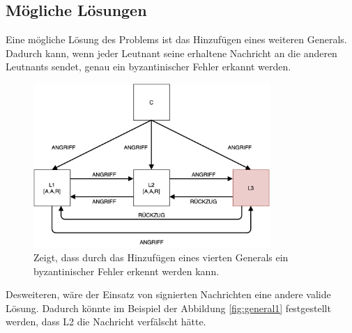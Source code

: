 \documentclass{article}
\begin{document}
\subsection{Mögliche Lösungen}
Eine mögliche Lösung des Problems ist das Hinzufügen eines weiteren Generals. 
Dadurch kann, wenn jeder Leutnant seine erhaltene Nachricht an die anderen Leutnants 
sendet, genau ein byzantinischer Fehler erkannt werden. 

\begin{figure}[H]
    \centering
    \includegraphics[width=0.8\textwidth]{omalgo.png}
    \caption{Zeigt, dass durch das Hinzufügen eines vierten Generals ein byzantinischer Fehler erkennt werden kann.}
    \label{fig:omalgo}
\end{figure}

\medskip 

Desweiteren, wäre der Einsatz von signierten Nachrichten eine andere valide Lösung. 
Dadurch könnte im Beispiel der Abbildung \ref{fig:general1} festgestellt werden,
dass L2 die Nachricht verfälscht hätte. 

\newpage

\printbibliography
\end{document}
